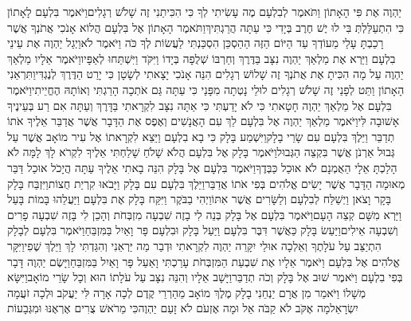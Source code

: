 \documentclass[../main/main.tex]{subfiles}
\begin{document}
\begin{multicols}{\ncols}
יַהְוֶה אֶת פִּי הָאָתוֹן וַתֹּאמֶר לְבִלְעָם מֶה עָשִׂיתִי לְךָ כִּי הִכִּיתַנִי זֶה שָׁלֹשׁ רְגָלִים\PreVerseSpace{}וַיֹּאמֶר בִּלְעָם לָאָתוֹן כִּי הִתְעַלַּלְתְּ בִּי לוּ יֶשׁ חֶרֶב בְּיָדִי כִּי עַתָּה הֲרַגְתִּיךְ\PreVerseSpace{}וַתֹּאמֶר הָאָתוֹן אֶל בִּלְעָם הֲלוֹא אָנֹכִי אֲתֹנְךָ אֲשֶׁר רָכַבְתָּ עָלַי מֵעוֹדְךָ עַד הַיּוֹם הַזֶּה הַהַסְכֵּן הִסְכַּנְתִּי לַעֲשׂוֹת לְךָ כֹּה וַיֹּאמֶר לֹא\PreVerseSpace{}וַיְגַל יַהְוֶה אֶת עֵינֵי בִלְעָם וַיַּרְא אֶת מַלְאַךְ יַהְוֶה נִצָּב בַּדֶּרֶךְ וְחַרְבּוֹ שְׁלֻפָה בְּיָדוֹ וַיִּקֹּד וַיִּשְׁתַּחוּ לְאַפָּיו\PreVerseSpace{}וַיֹּאמֶר אֵלָיו מַלְאַךְ יַהְוֶה עַל מָה הִכִּיתָ אֶת אֲתֹנְךָ זֶה שָׁלוֹשׁ רְגָלִים הִנֵּה אָנֹכִי יָצָאתִי לְשָׂטָן כִּי יָרַט הַדֶּרֶךְ לְנֶגְדִּי\PreVerseSpace{}וַתִּרְאַנִי הָאָתוֹן וַתֵּט לְפָנַי זֶה שָׁלֹשׁ רְגָלִים לוּלֵי\SubEnd{} נָטְתָה מִפָּנַי כִּי עַתָּה גַּם אֹתְכָה הָרַגְתִּי וְאוֹתָהּ הֶחֱיֵיתִי\PreVerseSpace{}וַיֹּאמֶר בִּלְעָם אֶל מַלְאַךְ יַהְוֶה חָטָאתִי כִּי לֹא יָדַעְתִּי כִּי אַתָּה נִצָּב לִקְרָאתִי בַּדָּרֶךְ וְעַתָּה אִם רַע בְּעֵינֶיךָ אָשׁוּבָה לִּי\PreVerseSpace{}וַיֹּאמֶר מַלְאַךְ יַהְוֶה אֶל בִּלְעָם לֵךְ עִם הָאֲנָשִׁים וְאֶפֶס אֶת הַדָּבָר אֲשֶׁר אֲדַבֵּר אֵלֶיךָ אֹתוֹ תְדַבֵּר וַיֵּלֶךְ בִּלְעָם עִם שָׂרֵי בָלָק\PreVerseSpace{}וַיִּשְׁמַע בָּלָק כִּי בָא בִלְעָם וַיֵּצֵא לִקְרָאתוֹ אֶל עִיר מוֹאָב אֲשֶׁר עַל גְּבוּל אַרְנֹן אֲשֶׁר בִּקְצֵה הַגְּבוּל\PreVerseSpace{}וַיֹּאמֶר בָּלָק אֶל בִּלְעָם הֲלֹא שָׁלֹחַ שָׁלַחְתִּי אֵלֶיךָ לִקְרֹא לָךְ לָמָּה לֹא הָלַכְתָּ אֵלָי הַאֻמְנָם לֹא אוּכַל כַּבְּדֶךָ\PreVerseSpace{}וַיֹּאמֶר בִּלְעָם אֶל בָּלָק הִנֵּה בָאתִי אֵלֶיךָ עַתָּה הֲיָכֹל אוּכַל דַּבֵּר מְאוּמָה הַדָּבָר אֲשֶׁר יָשִׂים אֱלֹהִים בְּפִי אֹתוֹ אֲדַבֵּר\PreVerseSpace{}וַיֵּלֶךְ בִּלְעָם עִם בָּלָק וַיָּבֹאוּ קִרְיַת חֻצוֹת\PreVerseSpace{}וַיִּזְבַּח בָּלָק בָּקָר וָצֹאן וַיְשַׁלַּח לְבִלְעָם וְלַשָּׂרִים אֲשֶׁר אִתּוֹ\PreVerseSpace{}וַיְהִי בַבֹּקֶר וַיִּקַּח בָּלָק אֶת בִּלְעָם וַיַּעֲלֵהוּ בָּמוֹת בָּעַל וַיַּרְא מִשָּׁם קְצֵה הָעָם\PreChapterSpace{}וַיֹּאמֶר בִּלְעָם אֶל בָּלָק בְּנֵה לִי בָזֶה שִׁבְעָה מִזְבְּחֹת וְהָכֵן לִי בָּזֶה שִׁבְעָה פָרִים וְשִׁבְעָה אֵילִים\PreVerseSpace{}וַיַּעַשׂ בָּלָק כַּאֲשֶׁר דִּבֶּר בִּלְעָם וַיַּעַל בָּלָק וּבִלְעָם פָּר וָאַיִל בַּמִּזְבֵּחַ\PreVerseSpace{}וַיֹּאמֶר בִּלְעָם לְבָלָק הִתְיַצֵּב עַל עֹלָתֶךָ וְאֵלְכָה אוּלַי יִקָּרֵה יַהְוֶה לִקְרָאתִי וּדְבַר מַה יַּרְאֵנִי וְהִגַּדְתִּי לָךְ וַיֵּלֶךְ שֶׁפִי\PreVerseSpace{}וַיִּקָּר אֱלֹהִים אֶל בִּלְעָם וַיֹּאמֶר אֵלָיו אֶת שִׁבְעַת הַמִּזְבְּחֹת עָרַכְתִּי וָאַעַל פָּר וָאַיִל בַּמִּזְבֵּחַ\PreVerseSpace{}וַיָּשֶׂם יַהְוֶה דָּבָר בְּפִי בִלְעָם וַיֹּאמֶר שׁוּב אֶל בָּלָק וְכֹה תְדַבֵּר\PreVerseSpace{}וַיָּשָׁב אֵלָיו וְהִנֵּה נִצָּב עַל עֹלָתוֹ הוּא וְכָל שָׂרֵי מוֹאָב\PreVerseSpace{}וַיִּשָּׂא מְשָׁלוֹ וַיֹּאמַר מִן אֲרָם יַנְחֵנִי בָלָק מֶלֶךְ מוֹאָב מֵהַרְרֵי קֶדֶם לְכָה אָרָה לִּי יַעֲקֹב וּלְכָה זֹעֲמָה יִשְׂרָאֵל\PreVerseSpace{}מָה אֶקֹּב לֹא קַבֹּה אֵל וּמָה אֶזְעֹם לֹא זָעַם יַהְוֶה\PreVerseSpace{}כִּי מֵרֹאשׁ צֻרִים אֶרְאֶנּוּ וּמִגְּבָעוֹת 
\end{multicols}
\end{document}

